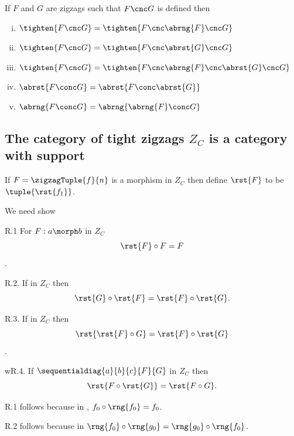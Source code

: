 \begin{lemma}
If $F$ and $G$ are zigzags such that $F \cnc G$ is defined then
\begin{enumerate}[(i)]
\item {} 
$\tighten{F \cnc G} = \tighten{F \cnc \abrng{F} \cnc G}$
\item {}
$\tighten{F \cnc G} = \tighten{F \cnc \abrst{G} \cnc G}$
\item {}
$\tighten{F \cnc G} = \tighten{F \cnc \abrng{F} \cnc \abrst{G} \cnc G}$
\item {}
$\abrst{F \conc G} = \abrst{F \conc \abrst{G}}$
\item {}
$\abrng{F \conc G} = \abrng{\abrng{F} \conc G}$
\end{enumerate}
\end{lemma}

\subsection{The category of tight zigzags $Z_C$ is a category with support}

If $F=\zigzagTuple{f}{n}$ is a morphism in $Z_C$ then define $\rst{F}$ to be $\tuple{\rst{f_1}}$.

We need show

R.1 For $F:a \morph b$ in $Z_C$ $$\rst{F} \circ F =F$$.

R.2. If \FGsourcediag in $Z_C$ then
$$\rst{G} \circ \rst{F}=\rst{F} \circ \rst{G}.$$

R.3. If \FGsourcediag in $Z_C$ then
$$\rst{\rst{F} \circ G} = \rst{F} \circ \rst{G}$$.

wR.4. If $\sequentialdiag{a}{b}{c}{F}{G}$ in $Z_C$ then
\[
\rst{F \circ \rst{G}} = \rst{F \circ G}.
\]

R.1 follows because in \catcw, $f_0 \circ \rng{f_0} = f_0$. 

R.2 follows because in \catcw $\rng{f_0} \circ \rng{g_0} = \rng{g_0} \circ \rng{f_0}$.


